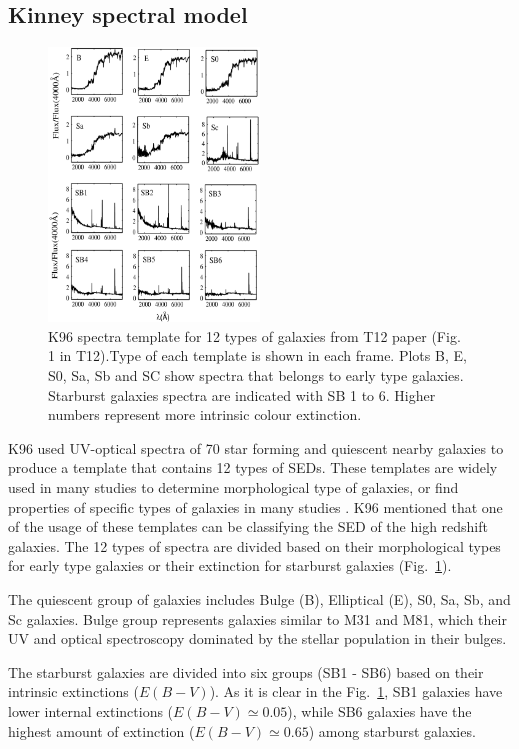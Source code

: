 \documentclass[useAMS,usenatbib]{mn2e}
\begin{document}
 \subsection{Kinney spectral model}
     \begin{figure}
        \centering
        \includegraphics[width=0.5\textwidth]{images/k96.jpg}
        \caption{K96 spectra template for 12 types of galaxies from T12 paper (Fig. 1 in T12).Type of each template is shown in each frame. Plots B, E, S0, Sa, Sb and SC show spectra that belongs to early type galaxies. Starburst galaxies spectra are indicated with SB 1 to 6. Higher numbers represent more intrinsic colour extinction.}
        \label{fig: k96}
    \end{figure}
      
    K96 used UV-optical spectra of 70 star forming and quiescent nearby galaxies to produce a template that contains 12 types of SEDs.
    These templates are widely used in many studies to determine morphological type of galaxies, or find properties of specific types of galaxies in many studies \citep[e.g.][]{Shakouri16,Paiano16,Laporte16,Holden16}.
    K96 mentioned that one of the usage of these templates can be classifying the SED of the high redshift galaxies. 
    The 12 types of spectra are divided based on their morphological types for early type galaxies or their extinction for starburst galaxies (Fig.~\ref{fig: k96}). 

    The quiescent group of galaxies includes Bulge (B), Elliptical (E), S0, Sa, Sb, and Sc galaxies.
    Bulge group represents galaxies similar to M31 and M81, which their UV and optical spectroscopy dominated by the stellar population in their bulges.
    
    The starburst galaxies are divided into six groups (SB1 - SB6) based on their intrinsic extinctions ($E(B-V)$). 
    As it is clear in the Fig.~\ref{fig: k96}, SB1 galaxies have lower internal extinctions ($E(B-V) \simeq 0.05$), while SB6 galaxies have the highest amount of extinction ($E(B-V) \simeq 0.65$) among starburst galaxies. 
    
\end{document}
